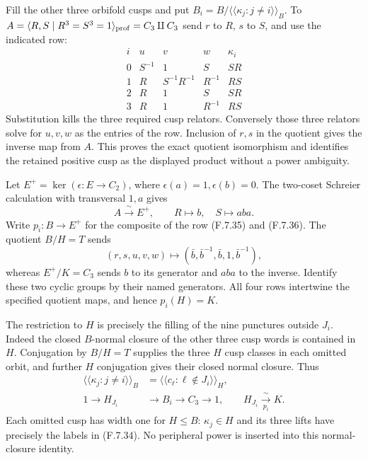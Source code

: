 Fill the other three orbifold cusps and put
$B_i=B/\langle\!\langle\kappa_j:j\ne i\rangle\!\rangle_B$.
To
$A=\langle R,S\mid R^3=S^3=1\rangle_{\rm prof}=C_3\amalg C_3$
send $r$ to $R$, $s$ to $S$, and use the indicated row:
\[
 \begin{array}{c|ccc|c}
 i&u&v&w&\kappa_i\\ \hline
 0&S^{-1}&1&S&SR\\
 1&R&S^{-1}R^{-1}&R^{-1}&RS\\
 2&R&1&S&SR\\
 3&R&1&R^{-1}&RS
 \end{array}                                                \tag{F.7.35}
\]
Substitution kills the three required cusp relators.
Conversely those three relators solve for $u,v,w$
as the entries of the row. Inclusion of $r,s$ in
the quotient gives the inverse map from $A$.
This proves the exact quotient isomorphism and
identifies the retained positive cusp as the
displayed product without a power ambiguity.

Let $E^+=\ker(\epsilon:E\to C_2)$, where
$\epsilon(a)=1,\epsilon(b)=0$.
The two-coset Schreier calculation with transversal
$1,a$ gives
\[
 A\xrightarrow{\ \sim\ }E^+,\qquad
                  R\longmapsto b,\quad S\longmapsto aba.
                                                               \tag{F.7.36}
\]
Write $p_i:B\to E^+$ for the composite of the row
(F.7.35) and (F.7.36).
The quotient $B/H=T$ sends
\[
 (r,s,u,v,w)\longmapsto
       (\bar b,\bar b^{-1},\bar b,1,\bar b^{-1}),
\]
whereas $E^+/K=C_3$ sends $b$ to its generator
and $aba$ to the inverse. Identify these two cyclic
groups by their named generators.
All four rows intertwine the specified quotient maps,
and hence $p_i(H)=K$.

The restriction to $H$ is precisely the filling
of the nine punctures outside $J_i$.
Indeed the closed $B$-normal closure of the other
three cusp words is contained in $H$.
Conjugation by $B/H=T$ supplies the three $H$ cusp
classes in each omitted orbit, and further
$H$ conjugation gives their closed normal closure.
Thus
\[
 \begin{split}
 \langle\!\langle\kappa_j:j\ne i\rangle\!\rangle_B
 &=\langle\!\langle c_\ell:\ell\notin J_i
                                      \rangle\!\rangle_H,\\
 1\longrightarrow H_{J_i}&\longrightarrow B_i
                 \longrightarrow C_3\longrightarrow1,
       \qquad H_{J_i}\xrightarrow[\ p_i\ ]{\ \sim\ }K .
 \end{split}                                                \tag{F.7.37}
\]
Each omitted cusp has width one for $H\leq B$:
$\kappa_j\in H$ and its three lifts have precisely
the labels in (F.7.34). No peripheral power is
inserted into this normal-closure identity.

